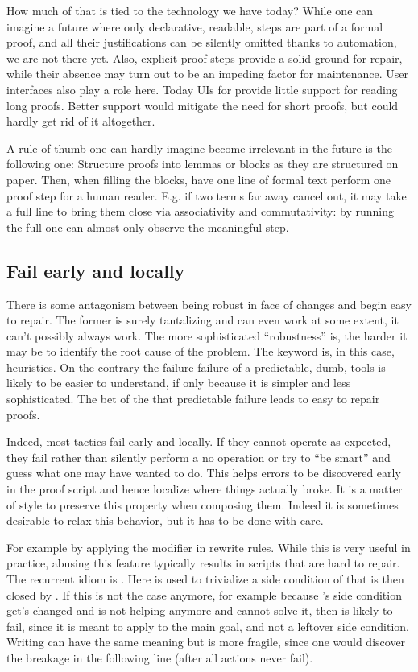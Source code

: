 How much of that is tied to the technology we have today?
While one can imagine a future where only declarative, readable, steps
are part of a formal proof, and all their justifications can be
silently omitted thanks to automation, we are not there yet. Also,
explicit proof steps provide a solid ground for repair, while their
absence may turn out to be an impeding factor for maintenance.
User interfaces also play a role here. Today UIs for
\Coq{} provide little support for reading long proofs. Better support
would mitigate the need for short proofs, but could hardly get rid of
it altogether.

A rule of thumb one can hardly imagine become irrelevant in the future
is the following one: Structure proofs into lemmas or blocks
as they are structured on paper. 
Then, when filling the blocks, have one line of formal text perform
one proof step for a human reader.  E.g. if two terms far away cancel
out, it may take a full line to bring them close via associativity and
commutativity: by running the full one can almost only observe the
meaningful step.

\subsection{Fail early and locally}

There is some antagonism between being robust in face of changes
and begin easy to repair. 
The former is surely tantalizing and
can even work at some extent, it can't possibly always work. The more
sophisticated ``robustness'' is, the harder it may be to identify
the root cause of the problem. The keyword is, in this case, heuristics.
On the contrary the failure failure of a predictable, dumb, tools
is likely to be easier to understand, if only because it is simpler
and less sophisticated. The bet of the \mcbSSR{} that predictable
failure leads to easy to repair proofs.

Indeed, most \mcbSSR{} tactics fail early and locally. If they cannot operate
as expected, they fail rather than silently perform a no operation or
try to ``be smart'' and guess what one may have wanted to do.
This helps errors to be discovered early in the proof script and hence
localize where things actually broke. It is a matter of style to
preserve this property when composing them. Indeed it is sometimes
desirable to relax this behavior, but it has to be done with care.

For example by applying the 
modifier in rewrite rules. While this is very useful in practice,
abusing this feature typically results in scripts that are hard to
repair. The recurrent idiom is .
Here  is used to trivialize a side condition of  that
is then closed by \C{//}. If this is not the case anymore, for example
because 's side condition get's changed and  is not
helping anymore and \C{//} cannot solve it, then
 is likely to fail, since it is meant to apply to the main
goal, and not a leftover side condition.
Writing  can have the same meaning but
is more fragile, since one would discover the breakage in the
following line (after  all actions never fail).


